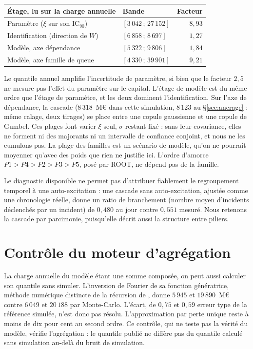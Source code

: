 \begin{center}\footnotesize
\renewcommand{\arraystretch}{1.25}
\begin{tabular}{@{}l l r@{}}
\toprule
\textbf{Étage, lu sur la charge annuelle} & \textbf{Bande} & \textbf{Facteur} \\
\midrule
Paramètre ($\xi$ sur son IC$_{90}$) & $[3\,042\,;\,27\,152]$ & $8{,}93$ \\
Identification (direction de $W$) & $[6\,858\,;\,8\,697]$ & $1{,}27$ \\
Modèle, axe dépendance & $[5\,322\,;\,9\,806]$ & $1{,}84$ \\
Modèle, axe famille de queue & $[4\,330\,;\,39\,901]$ & $9{,}21$ \\
\bottomrule
\end{tabular}
\end{center}

\vspace{4pt}
\noindent Le quantile annuel amplifie l'incertitude de paramètre, si bien que le facteur
$2{,}5$ ne mesure pas l'effet du paramètre sur le capital. L'étage de modèle est du même ordre que
l'étage de paramètre, et les deux dominent l'identification. Sur l'axe de dépendance, la cascade
($8\,318$~M\euro{} dans cette simulation, $8\,123$ au \S\ref{sec:ancrage} : même calage, deux tirages) se place entre une copule gaussienne et une copule de Gumbel. Ces plages font varier $\xi$ seul, $\sigma$ restant fixé : sans leur covariance, elles ne forment ni des majorants ni un intervalle de confiance conjoint, et nous ne les cumulons pas. La plage des familles est un scénario de modèle, qu'on ne pourrait moyenner qu'avec des poids que rien ne justifie ici. L'ordre d'amorce $P1>P4>P2>P3>P5$, posé par ROOT, ne dépend pas de la famille.

Le diagnostic disponible ne permet pas d'attribuer fiablement le regroupement temporel à une auto-excitation : une
cascade sans auto-excitation, ajustée comme une chronologie réelle, donne un ratio de branchement (nombre moyen d'incidents déclenchés par un incident) de
$0{,}480$ au jour contre $0{,}551$ mesuré. Nous retenons la cascade par parcimonie, puisqu'elle
décrit aussi la structure entre piliers.

\section{Contrôle du moteur d'agrégation}
\label{sec:triangulation-agregation}

La charge annuelle du modèle étant une somme composée, on peut aussi calculer son quantile sans
simuler. L'inversion de Fourier de sa fonction génératrice, méthode numérique distincte de la récursion de \citet{panjer1981}, donne $5\,945$ et $19\,890$~M\euro{} contre $6\,049$ et $20\,188$ par Monte-Carlo.
L'écart, de $0{,}75$ et $0{,}59$ erreur type de la référence simulée, n'est donc pas résolu. L'approximation par perte unique \citep{bockerkluppelberg2005} reste à moins de dix pour cent
au second ordre. Ce contrôle, qui ne teste pas la vérité du modèle, vérifie l'agrégation : le quantile publié ne
diffère pas du quantile calculé sans simulation au-delà du bruit de simulation.


